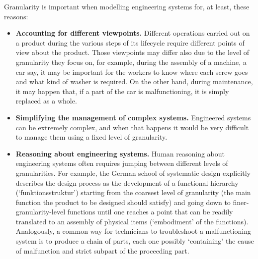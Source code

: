 \documentclass[
]{ceurart}
\begin{document}
Granularity is important when modelling engineering systems for, at least, these reasons:
\begin{itemize}
    \item \textbf{Accounting for different viewpoints.} Different operations carried out on a product during the various steps of its lifecycle require different points of view about the product. Those viewpoints may differ also due to the level of granularity they focus on, for example, during the assembly of a machine, a car say, it may be important for the workers to know where each screw goes and what kind of washer is required. On the other hand, during maintenance, it may happen that, if a part of the car is malfunctioning, it is simply replaced as a whole.%
    \item \textbf{Simplifying the management of complex systems.} Engineered systems can be extremely complex, and when that happens it would be very difficult to manage them using a fixed level of granularity. %
    \item \textbf{Reasoning about engineering systems.} Human reasoning about engineering systems often requires jumping between different levels of granularities. For example, the German school of systematic design \cite{pahl_engineering_2007} explicitly describes the design process as the development of a functional hierarchy (`funktionsstruktur') starting from the coarsest level of granularity (the main function the product to be designed should satisfy) and going down to finer-granularity-level functions until one reaches a point that can be readily translated to an assembly of physical items (`embodiment' of the functions). Analogously, a common way for technicians to troubleshoot a malfunctioning system is to produce a chain of parts, each one possibly `containing' the cause of malfunction and strict subpart of the proceeding part.%

\end{itemize}
\end{document}
